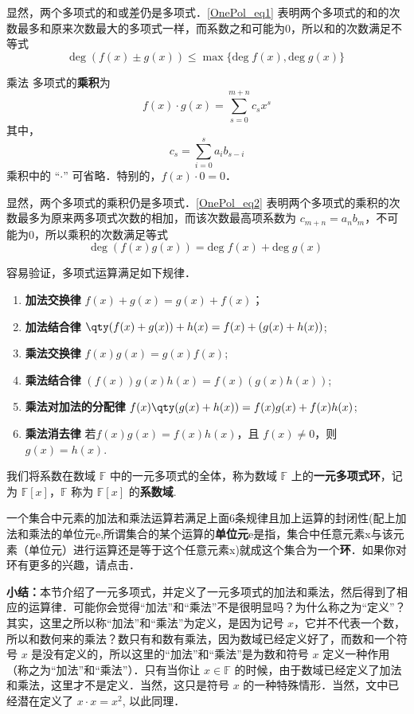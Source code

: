 显然，两个多项式的和或差仍是多项式．\autoref{OnePol_eq1} 表明两个多项式的和的次数最多和原来次数最大的多项式一样，而系数之和可能为0，所以和的次数满足不等式
\begin{equation}\label{OnePol_eq3}
\mathrm{deg}\;(f(x)\pm g(x))\leq \max\{\mathrm{deg}\;f(x),\mathrm{deg}\;g(x)\}
\end{equation}
\begin{definition}{乘法}
多项式的\textbf{乘积}为
\begin{equation}
f(x)\cdot g(x)=\sum_{s=0}^{m+n} c_s x^s
\label{OnePol_eq2}
\end{equation}
其中，
\begin{equation}
c_s=\sum_{i=0}^s a_i b_{s-i}
\end{equation}
乘积中的 “$\cdot$” 可省略．特别的，$f(x)\cdot 0=0$．
\end{definition}

显然，两个多项式的乘积仍是多项式．\autoref{OnePol_eq2} 表明两个多项式的乘积的次数最多为原来两多项式次数的相加，而该次数最高项系数为 $c_{m+n}=a_n b_m$，不可能为0，所以乘积的次数满足等式
\begin{equation}\label{OnePol_eq4}
\mathrm{deg}\;(f(x)g(x))= \mathrm{deg}\;f(x)+\mathrm{deg}\;g(x)
\end{equation}

容易验证，多项式运算满足如下规律．
\begin{enumerate}
\item \textbf{加法交换律} $f(x)+g(x)=g(x)+f(x)$；
\item \textbf{加法结合律} $\qty(f(x)+g(x))+h(x)=f(x)+(g(x)+h(x))$;
\item \textbf{乘法交换律} $f(x)g(x)=g(x)f(x)$;
\item \textbf{乘法结合律} $(f(x))g(x)h(x)=f(x)(g(x)h(x))$;
\item \textbf{乘法对加法的分配律} $f(x)\qty(g(x)+h(x))=f(x)g(x)+f(x)h(x)$;
\item \textbf{乘法消去律} 若$f(x)g(x)=f(x)h(x)$，且 $f(x)\neq0$，则 $g(x)=h(x)$.
\end{enumerate}
我们将系数在数域 $\mathbb{F}$ 中的一元多项式的全体，称为数域 $\mathbb{F}$ 上的\textbf{一元多项式环}，记为 $\mathbb{F}[x]$，$\mathbb{F}$ 称为 $\mathbb{F}[x]$ 的\textbf{系数域}.

一个集合中元素的加法和乘法运算若满足上面6条规律且加上运算的封闭性(配上加法和乘法的单位元e,所谓集合的某个运算的\textbf{单位元}e是指，集合中任意元素x与该元素（单位元）进行运算还是等于这个任意元素x)就成这个集合为一个\textbf{环}．如果你对环有更多的兴趣，请点击．

\textbf{小结：}本节介绍了一元多项式，并定义了一元多项式的加法和乘法，然后得到了相应的运算律．可能你会觉得“加法”和“乘法”不是很明显吗？为什么称之为“定义”？其实，这里之所以称“加法”和“乘法”为定义，是因为记号 $x$，它并不代表一个数，所以和数何来的乘法？数只有和数有乘法，因为数域已经定义好了，而数和一个符号 $x$ 是没有定义的，所以这里的“加法”和“乘法”是为数和符号 $x$ 定义一种作用（称之为“加法”和“乘法”）．只有当你让 $x\in \mathbb{F}$ 的时候，由于数域已经定义了加法和乘法，这里才不是定义．当然，这只是符号 $x$ 的一种特殊情形．当然，文中已经潜在定义了 $x\cdot x=x^2$, 以此同理．